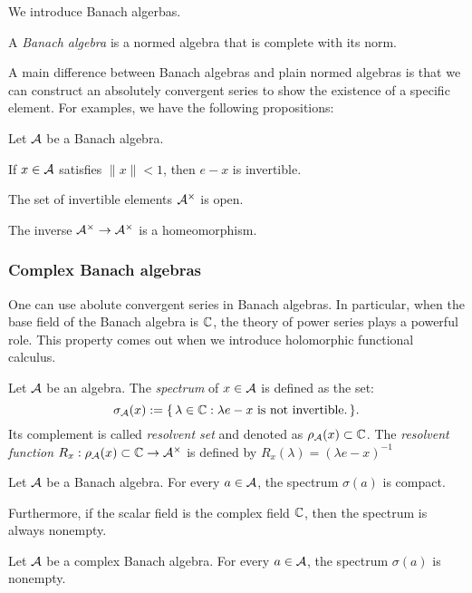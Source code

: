 \documentclass{../crs}
\begin{document}
We introduce Banach algerbas.
\begin{defn}
A \emph{Banach algebra} is a normed algebra that is complete with its norm.
\end{defn}
A main difference between Banach algebras and plain normed algebras is that we can construct an absolutely convergent series to show the existence of a specific element.
For examples, we have the following propositions:
\begin{prop}
Let $\mathcal{A}$ be a Banach algebra.
\begin{cond}
\item If $x\in\mathcal{A}$ satisfies $\|x\|<1$, then $e-x$ is invertible.
\item The set of invertible elements $\mathcal{A}^\times$ is open.
\item The inverse $\mathcal{A}^\times\to\mathcal{A}^\times$ is a homeomorphism.
\end{cond}
\end{prop}


\subsubsection{Complex Banach algebras}

One can use abolute convergent series in Banach algebras.
In particular, when the base field of the Banach algebra is $\mathbb{C}$, the theory of power series plays a powerful role.
This property comes out when we introduce holomorphic functional calculus.

\begin{defn}
Let $\mathcal{A}$ be an algebra.
The \emph{spectrum} of $x\in\mathcal{A}$ is defined as the set:
\[\sigma_{\mathcal{A}}(x):=\{\,\lambda\in\mathbb{C}:\lambda e-x\text{ is not invertible.}\,\}.\]
Its complement is called \emph{resolvent set} and denoted as $\rho_{\mathcal{A}}(x)\subset\mathbb{C}$.
The \emph{resolvent function} $R_x:\rho_{\mathcal{A}}(x)\subset\mathbb{C}\to\mathcal{A}^\times$ is defined by $R_x(\lambda)=(\lambda e-x)^{-1}$
\end{defn}
\begin{thm}
Let $\mathcal{A}$ be a Banach algebra.
For every $a\in\mathcal{A}$, the spectrum $\sigma(a)$ is compact.
\end{thm}
Furthermore, if the scalar field is the complex field $\mathbb{C}$, then the spectrum is always nonempty.
\begin{thm}
Let $\mathcal{A}$ be a complex Banach algebra.
For every $a\in\mathcal{A}$, the spectrum $\sigma(a)$ is nonempty.
\end{thm}
\end{document}
